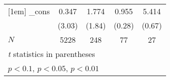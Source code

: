 {\begin{tabular}{l*{4}{c}}
[1em]
\_cons      &       0.347\sym{***}&       1.774\sym{*}  &       0.955         &       5.414         \\
            &      (3.03)         &      (1.84)         &      (0.28)         &      (0.67)         \\
\hline
\(N\)       &        5228         &         248         &          77         &          27         \\
\hline\hline
\multicolumn{5}{l}{\footnotesize \textit{t} statistics in parentheses}\\
\multicolumn{5}{l}{\footnotesize \sym{*} \(p<0.1\), \sym{**} \(p<0.05\), \sym{***} \(p<0.01\)}\\
\end{tabular}
}
